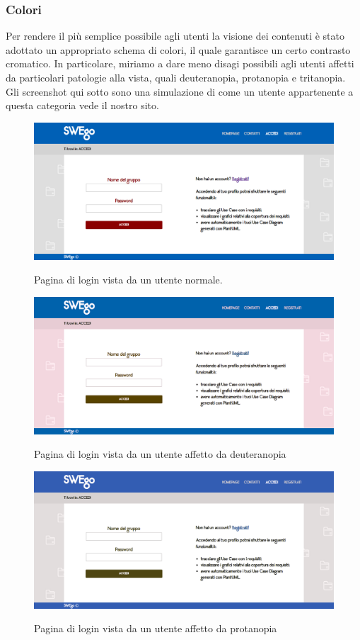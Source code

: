 \subsubsection{Colori}
Per rendere il più semplice possibile agli utenti la visione dei contenuti è stato adottato un appropriato schema di colori, il quale garantisce un certo contrasto cromatico.
	In particolare, miriamo a dare meno disagi possibili agli utenti affetti da particolari patologie alla vista, quali deuteranopia, protanopia e tritanopia. \\
	Gli screenshot qui sotto sono una simulazione di come un utente appartenente a questa categoria vede il nostro sito.\\
	\begin{figure}
	\centering
		\includegraphics[scale=0.4]{img/normale.png}\\[1cm] \caption{Pagina di login vista da un utente normale.}
	\end{figure}
	\begin{figure}
	\centering
		\includegraphics[scale=0.3]{img/deuteranopia.png}\\[1cm] \caption{Pagina di login vista da un utente affetto da deuteranopia}
	\end{figure}
	\begin{figure}
	\centering
		\includegraphics[scale=0.3]{img/protanopia.png}\\[1cm] \caption{Pagina di login vista da un utente affetto da protanopia}
	\end{figure}
